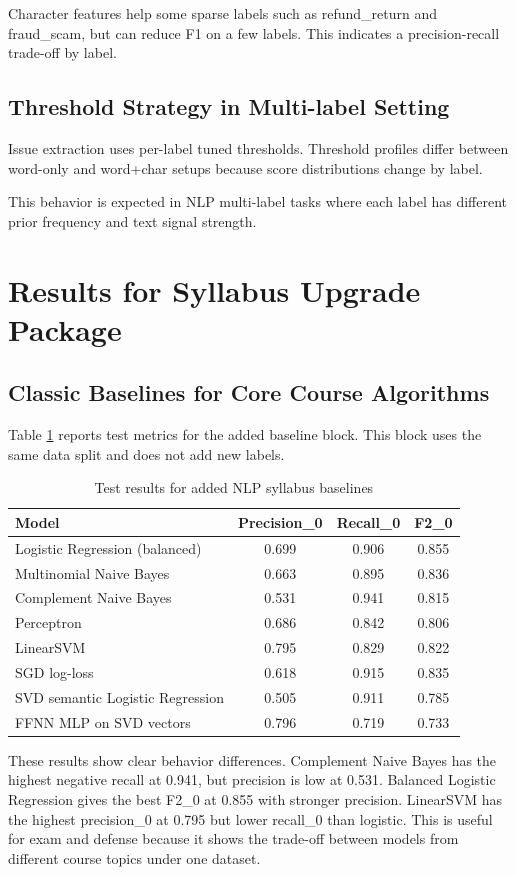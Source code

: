 \documentclass[12pt,a4paper]{article}
\begin{document}
Character features help some sparse labels such as refund\_return and fraud\_scam, but can reduce F1 on a few labels. This indicates a precision-recall trade-off by label.

\subsection{Threshold Strategy in Multi-label Setting}
Issue extraction uses per-label tuned thresholds. Threshold profiles differ between word-only and word+char setups because score distributions change by label.

This behavior is expected in NLP multi-label tasks where each label has different prior frequency and text signal strength.

\section{Results for Syllabus Upgrade Package}
\subsection{Classic Baselines for Core Course Algorithms}
Table \ref{tab:nlp_syllabus_bench} reports test metrics for the added baseline block. This block uses the same data split and does not add new labels.

\begin{table}[H]
\centering
\caption{Test results for added NLP syllabus baselines}
\label{tab:nlp_syllabus_bench}
\begin{tabular}{lccc}
\toprule
Model & Precision\_0 & Recall\_0 & F2\_0 \\
\midrule
Logistic Regression (balanced) & 0.699 & 0.906 & 0.855 \\
Multinomial Naive Bayes & 0.663 & 0.895 & 0.836 \\
Complement Naive Bayes & 0.531 & 0.941 & 0.815 \\
Perceptron & 0.686 & 0.842 & 0.806 \\
LinearSVM & 0.795 & 0.829 & 0.822 \\
SGD log-loss & 0.618 & 0.915 & 0.835 \\
SVD semantic Logistic Regression & 0.505 & 0.911 & 0.785 \\
FFNN MLP on SVD vectors & 0.796 & 0.719 & 0.733 \\
\bottomrule
\end{tabular}
\end{table}

These results show clear behavior differences. Complement Naive Bayes has the highest negative recall at 0.941, but precision is low at 0.531. Balanced Logistic Regression gives the best F2\_0 at 0.855 with stronger precision. LinearSVM has the highest precision\_0 at 0.795 but lower recall\_0 than logistic. This is useful for exam and defense because it shows the trade-off between models from different course topics under one dataset.
\end{document}
